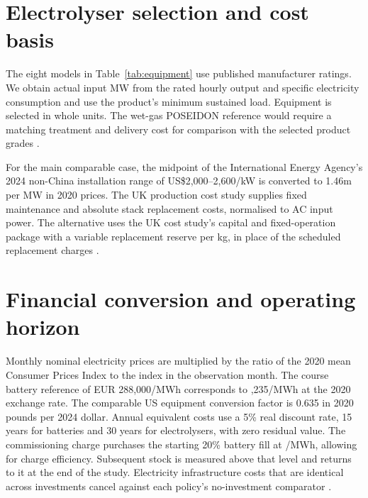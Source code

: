 \newpage
\section{Electrolyser selection and cost basis}
The eight models in Table~\ref{tab:equipment} use published manufacturer
ratings. We obtain actual input MW from the rated hourly output and
specific electricity consumption and use the product's minimum sustained
load. Equipment is selected in whole units. The wet-gas POSEIDON
reference would require a matching treatment and delivery cost for
comparison with the selected product grades \cite{brief,v6}.

For the main comparable case, the midpoint of the International Energy
Agency's 2024 non-China installation range of US\$2,000--2,600/kW
is converted to \gbp 1.46m per MW in 2020 prices. The UK production
cost study supplies fixed maintenance and absolute stack replacement
costs, normalised to AC input power. The alternative uses the UK cost
study's capital and fixed-operation package with a variable replacement
reserve per kg, in place of the scheduled replacement charges
\cite{iea,beis,basis,v6}.

\section{Financial conversion and operating horizon}
Monthly nominal electricity prices are multiplied by the ratio of the
2020 mean Consumer Prices Index to the index in the observation month.
The course battery reference of EUR 288,000/MWh corresponds to
,235/MWh at the 2020 exchange rate. The comparable US equipment
conversion factor is 0.635 in 2020 pounds per 2024 dollar. Annual
equivalent costs use a 5\% real discount rate, 15 years for batteries
and 30 years for electrolysers, with zero residual value. The
commissioning charge purchases the starting 20\% battery fill at
/MWh, allowing for charge efficiency. Subsequent stock is
measured above that level and returns to it at the end of the study.
Electricity infrastructure costs that are identical across investments
cancel against each policy's no-investment comparator \cite{cpi,basis,v6}.
